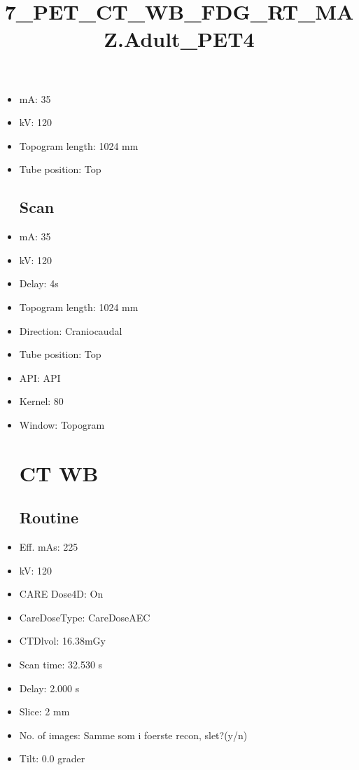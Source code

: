 \documentclass[12pt]{article}
\title{7\_PET\_CT\_WB\_FDG\_RT\_MAZ.Adult\_PET4}
\begin{document}
\maketitle
\newpage
\tableofcontents
\newpage
{}


\begin{itemize}\section{Topogram}
\subsection{Routine}
\item mA: 35\item kV: 120\item Topogram length: 1024 mm\item Tube position: Top
\subsection{Scan}\item mA: 35\item kV: 120\item Delay: 4s\item Topogram length: 1024 mm\item Direction: Craniocaudal\item Tube position: Top\item API: API \item Kernel: 80\item Window: Topogram
\section{CT WB}
\subsection{Routine}
\item Eff. mAs: 225\item kV: 120\item CARE Dose4D: On\item CareDoseType: CareDoseAEC\item CTDlvol: 16.38mGy\item Scan time: 32.530 s\item Delay: 2.000 s\item Slice: 2 mm\item No. of images: Samme som i foerste recon, slet?(y/n)\item Tilt: 0.0 grader

\end{itemize}
\end{document}
